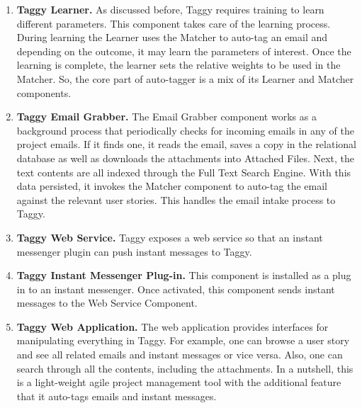 \begin{enumerate}
	\item \textbf{Taggy Learner.} As discussed before, Taggy requires training to learn different parameters. This component takes care of the learning process. During learning the Learner uses the Matcher to auto-tag an email and depending on the outcome, it may learn the parameters of interest. Once the learning is complete, the learner sets the relative weights to be used in the Matcher. So, the core part of auto-tagger is a mix of its Learner and Matcher components.
	
	\item \textbf{Taggy Email Grabber.} The Email Grabber component works as a background process that periodically checks for incoming emails in any of the project emails. If it finds one, it reads the email, saves a copy in the relational database as well as downloads the attachments into Attached Files. Next, the text contents are all indexed through the Full Text Search Engine. With this data persisted, it invokes the Matcher component to auto-tag the email against the relevant user stories. This handles the email intake process to Taggy.
	
	\item \textbf{Taggy Web Service.} Taggy exposes a web service so that an instant messenger plugin can push instant messages to Taggy.
	
	\item \textbf{Taggy Instant Messenger Plug-in.} This component is installed as a plug in to an instant messenger. Once activated, this component sends instant messages to the Web Service Component.
	
	\item \textbf{Taggy Web Application.} The web application provides interfaces for manipulating everything in Taggy. For example, one can browse a user story and see all related emails and instant messages or vice versa. Also, one can search through all the contents, including the attachments. In a nutshell, this is a light-weight agile project management tool with the additional feature that it auto-tags emails and instant messages.
\end{enumerate}

